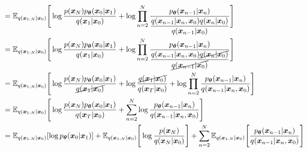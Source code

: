 \documentclass[14pt, a4paper]{article}
\numberwithin{equation}{section}
\numberwithin{figure}{section}
\numberwithin{dl}{section}
\numberwithin{md}{section}
\numberwithin{bd}{section}
\numberwithin{dn}{section}
\numberwithin{hq}{section}
\begin{document}
\begin{equation*}
\begin{aligned}
            &= \mathbb{E}_{q(\boldsymbol{x}_{1:N} \vert \boldsymbol{x}_0)} \Bigg \lbrack \log \dfrac{p(\boldsymbol{x}_N) p_{\boldsymbol{\theta}} (\boldsymbol{x}_0 \vert \boldsymbol{x}_1)}{q(\boldsymbol{x}_1 \vert \boldsymbol{x}_0)} + \log \prod_{n=2}^N \dfrac{p_{\boldsymbol{\theta}} (\boldsymbol{x}_{n-1} \vert \boldsymbol{x}_n)}{\dfrac{q(\boldsymbol{x}_{n-1} \vert \boldsymbol{x}_n, \boldsymbol{x}_0) q(\boldsymbol{x}_n \vert \boldsymbol{x}_0)}{q(\boldsymbol{x}_{n-1} \vert \boldsymbol{x}_0)}} \Bigg \rbrack \\
            &= \mathbb{E}_{q(\boldsymbol{x}_{1:N} \vert \boldsymbol{x}_0)} \Bigg \lbrack \log \dfrac{p(\boldsymbol{x}_N) p_{\boldsymbol{\theta}} (\boldsymbol{x}_0 \vert \boldsymbol{x}_1)}{q(\boldsymbol{x}_1 \vert \boldsymbol{x}_0)} + \log \prod_{n=2}^N \dfrac{p_{\boldsymbol{\theta}} (\boldsymbol{x}_{n-1} \vert \boldsymbol{x}_n)}{\dfrac{q(\boldsymbol{x}_{n-1} \vert \boldsymbol{x}_n, \boldsymbol{x}_0) \cancel{q(\boldsymbol{x}_n \vert \boldsymbol{x}_0)}}{\cancel{q(\boldsymbol{x}_{n-1} \vert \boldsymbol{x}_0)}}} \Bigg \rbrack \\
            &= \mathbb{E}_{q(\boldsymbol{x}_{1:N} \vert \boldsymbol{x}_0)} \Bigg \lbrack \log \dfrac{p(\boldsymbol{x}_N) p_{\boldsymbol{\theta}} (\boldsymbol{x}_0 \vert \boldsymbol{x}_1)}{\cancel{q(\boldsymbol{x}_1 \vert \boldsymbol{x}_0)}} + \log \dfrac{\cancel{q(\boldsymbol{x}_1 \vert \boldsymbol{x}_0)}}{q(\boldsymbol{x}_T \vert \boldsymbol{x}_0)} + \log \prod_{n=2}^N \dfrac{p_{\boldsymbol{\theta}} (\boldsymbol{x}_{n-1} \vert \boldsymbol{x}_n)}{q(\boldsymbol{x}_{n-1} \vert \boldsymbol{x}_n, \boldsymbol{x}_0)} \Bigg \rbrack \\
            &= \mathbb{E}_{q(\boldsymbol{x}_{1:N} \vert \boldsymbol{x}_0)} \Bigg \lbrack \log \dfrac{p(\boldsymbol{x}_N) p_{\boldsymbol{\theta}} (\boldsymbol{x}_0 \vert \boldsymbol{x}_1)}{q(\boldsymbol{x}_T \vert \boldsymbol{x}_0)} + \sum_{n=2}^N \log \dfrac{p_{\boldsymbol{\theta}} (\boldsymbol{x}_{n-1} \vert \boldsymbol{x}_n)}{q(\boldsymbol{x}_{n-1} \vert \boldsymbol{x}_n, \boldsymbol{x}_0)} \Bigg \rbrack \\
            &= \mathbb{E}_{q(\boldsymbol{x}_{1:N} \vert \boldsymbol{x}_0)} \lbrack \log p_{\boldsymbol{\theta}} (\boldsymbol{x}_0 \vert \boldsymbol{x}_1) \rbrack + \mathbb{E}_{q(\boldsymbol{x}_{1:N} \vert \boldsymbol{x}_0)} \Bigg \lbrack \log \dfrac{p(\boldsymbol{x}_N)}{q(\boldsymbol{x}_N \vert \boldsymbol{x}_0)} \Bigg \rbrack + \sum_{n=2}^N \mathbb{E}_{q(\boldsymbol{x}_{1:N} \vert \boldsymbol{x}_0)} \Bigg \lbrack \dfrac{p_{\boldsymbol{\theta}} (\boldsymbol{x}_{n-1} \vert \boldsymbol{x}_n)}{q(\boldsymbol{x}_{n-1} \vert \boldsymbol{x}_n, \boldsymbol{x}_0)} \Bigg \rbrack \\

\end{aligned}
\end{equation*}
\end{document}
